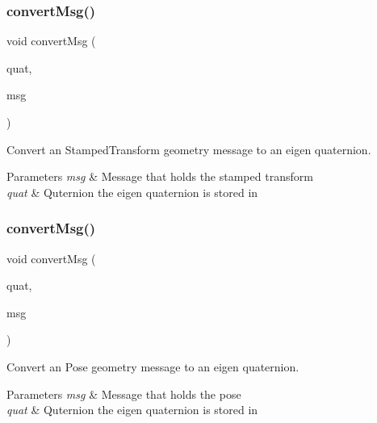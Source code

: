 \subsubsection{\texorpdfstring{convert\+Msg()}{convertMsg()}\hspace{0.1cm}{\footnotesize\ttfamily [3/14]}}
{\footnotesize\ttfamily void convert\+Msg (\begin{DoxyParamCaption}\item[{Eigen\+::\+Quaterniond \&}]{quat,  }\item[{geometry\+\_\+msgs\+::\+Transform\+Stamped \&}]{msg }\end{DoxyParamCaption})\hspace{0.3cm}{\ttfamily [inline]}}



Convert an Stamped\+Transform geometry message to an eigen quaternion. 


\begin{DoxyParams}{Parameters}
{\em msg} & Message that holds the stamped transform \\
\hline
{\em quat} & Quternion the eigen quaternion is stored in \\
\hline
\end{DoxyParams}
\mbox{\label{group__MultiRobotController_gadc07db93efb76fd809b67b74dd13b939}} 
\subsubsection{\texorpdfstring{convert\+Msg()}{convertMsg()}\hspace{0.1cm}{\footnotesize\ttfamily [4/14]}}
{\footnotesize\ttfamily void convert\+Msg (\begin{DoxyParamCaption}\item[{Eigen\+::\+Quaterniond \&}]{quat,  }\item[{geometry\+\_\+msgs\+::\+Pose \&}]{msg }\end{DoxyParamCaption})\hspace{0.3cm}{\ttfamily [inline]}}



Convert an Pose geometry message to an eigen quaternion. 


\begin{DoxyParams}{Parameters}
{\em msg} & Message that holds the pose \\
\hline
{\em quat} & Quternion the eigen quaternion is stored in \\
\hline
\end{DoxyParams}
\mbox{\label{group__MultiRobotController_ga8257db2bb94ec53eadfe87d04b38cc0b}} 
